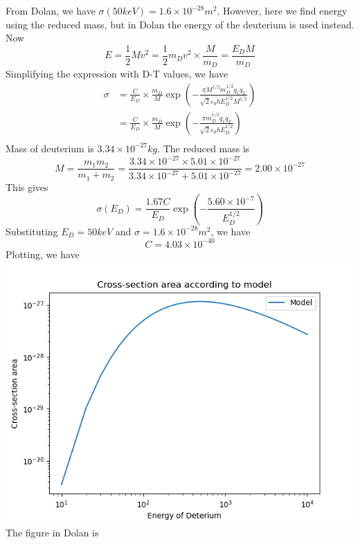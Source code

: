 \documentclass[answers]{exam}
\begin{document}
\begin{questions}
\begin{parts}
\begin{solution}
    From Dolan, we have $\sigma(50\unit{keV}) = 1.6 \times 10^{-28}\unit{m^2}$. However, here we find energy using the reduced mass, but in Dolan the energy of the deuterium is used instead. Now
    $$E = \frac{1}{2}Mv^2 = \frac{1}{2}m_Dv^2 \times \frac{M}{m_D} = \frac{E_DM}{m_D}$$
    Simplifying the expression with D-T values, we have
    \begin{align*}
        \sigma &= \frac{C}{E_D} \times \frac{m_D}{M} \exp\left(-\frac{\pi M^{1/2}m_D^{1/2}q_1q_2}{\sqrt{2}\varepsilon_0hE_D^{1/2}M^{1/2}}\right) \\
               &= \frac{C}{E_D} \times \frac{m_D}{M} \exp\left(-\frac{\pi m_D^{1/2}q_1q_2}{\sqrt{2}\varepsilon_0hE_D^{1/2}}\right)\\
    \end{align*}
    Mass of deuterium is $3.34\times10^{-27}\unit{kg}$. The reduced mass is
    $$M = \frac{m_1m_2}{m_1+m_2} = \frac{3.34\times10^{-27}\times5.01\times10^{-27}}{3.34\times10^{-27}+5.01\times10^{-27}} = 2.00 \times 10^{-27}$$
    This gives
    $$\sigma(E_D) = \frac{1.67C}{E_D}\exp\left(-\frac{5.60\times10^{-7}}{E_D^{1/2}}\right)$$
    Substituting $E_D = 50\unit{keV}$ and $\sigma = 1.6\times10^{-28}\unit{m^2}$, we have
    $$C = 4.03 \times 10^{-40}$$
    Plotting, we have \\
    \includegraphics[width=\textwidth]{model.png}
    The figure in Dolan is \\

\end{solution}
\end{parts}
\end{questions}
\end{document}
